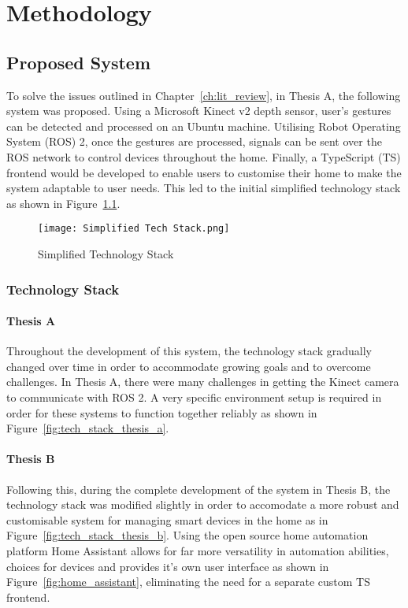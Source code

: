 \chapter{Methodology}\label{ch:methodology}

\section{Proposed System}

To solve the issues outlined in Chapter~\ref*{ch:lit_review}, in Thesis A, the following system was proposed.
Using a Microsoft Kinect v2 depth sensor, user's gestures can be detected and processed on an Ubuntu machine.
Utilising Robot Operating System (ROS) 2, once the gestures are processed, signals can be sent over the ROS network to control devices throughout the home.
Finally, a TypeScript (TS) frontend would be developed to enable users to customise their home to make the system adaptable to user needs.
This led to the initial simplified technology stack as shown in Figure~\ref{fig:simple_tech_stack}.

\begin{figure}[!htb]
    \caption{Simplified Technology Stack}
    \centering
    \texttt{[image: Simplified Tech Stack.png]}
    \label{fig:simple_tech_stack}
\end{figure}

\subsection{Technology Stack}
\subsubsection{Thesis A}
Throughout the development of this system, the technology stack gradually changed over time in order to accommodate growing goals and to overcome challenges.
In Thesis A, there were many challenges in getting the Kinect camera to communicate with ROS 2.
A very specific environment setup is required in order for these systems to function together reliably as shown in Figure~\ref{fig:tech_stack_thesis_a}.

\subsubsection{Thesis B}
Following this, during the complete development of the system in Thesis B, the technology stack was modified slightly in order to accomodate a more robust and customisable system for managing smart devices in the home as in Figure~\ref{fig:tech_stack_thesis_b}.
Using the open source home automation platform Home Assistant allows for far more versatility in automation abilities, choices for devices and provides it's own user interface as shown in Figure~\ref{fig:home_assistant}, eliminating the need for a separate custom TS frontend.

